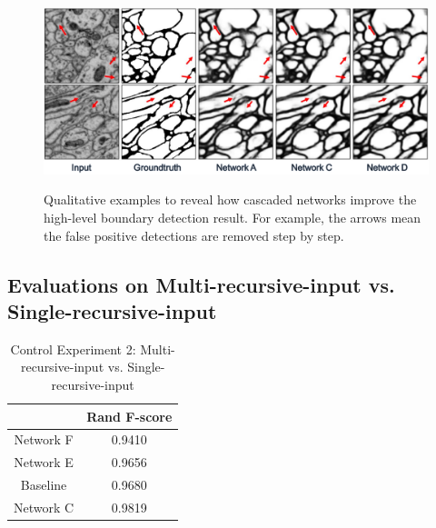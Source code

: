 \documentclass[senior]{IPSstyle}
\begin{document}
\begin{figure}[t]
  \centering
  \includegraphics[width=15cm]{control_1.png}\\
  \caption{Qualitative examples to reveal how cascaded networks improve the high-level boundary detection result. For example, the arrows mean the false positive detections are removed step by step.}\label{control 1}
\end{figure}

\subsection{Evaluations on Multi-recursive-input vs. Single-recursive-input}

\begin{table}[t]
\renewcommand{\arraystretch}{0.6}
\caption{Control Experiment 2: Multi-recursive-input vs. Single-recursive-input}
\label{outcome}
\begin{center}
\begin{tabular}{|c|c|}
\hline
&\multicolumn{1}{c|}{Rand F-score}\\
\hline
Network F 		& 0.9410 	\\	\hline
Network E			& 0.9656	 \\	\hline
Baseline	 		& 0.9680	\\	\hline
Network C 		& 0.9819	\\	\hline
\end{tabular}
\end{center}
\label{control_experiment_2}
\end{table}
\end{document}
